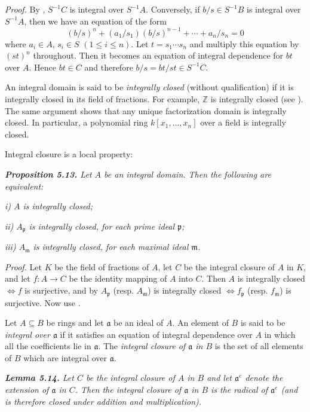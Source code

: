 \noindent\emph{Proof.}  By , $S^{-1}C$ is integral over $S^{-1}A$.  Conversely, if $b/s\in S^{-1}B$ is
integral over $S^{-1}A$, then we have an equation of the form
\[
(b/s)^n+(a_1/s_1)(b/s)^{n-1}+\cdots+a_n/s_n=0
\]
where $a_i\in A$, $s_i\in S$ $(1\leq i\leq n)$.  Let $t=s_1\cdots s_n$ and multiply this equation by
$(st)^n$ throughout.  Then it becomes an equation of integral dependence for $bt$
over $A$.  Hence $bt\in C$ and therefore $b/s=bt/st\in S^{-1}C$.\proofbox

An integral domain is said to be \emph{integrally closed} (without qualification)
if it is integrally closed in its field of fractions.  For example, $\mathbb Z$ is integrally
closed (see ).  The same argument shows that any unique factorization
domain is integrally closed.  In particular, a polynomial ring $k[x_1,\ldots,x_n]$ over
a field is integrally closed.

Integral closure is a local property:

\medskip
\noindent\textit{\textbf{Proposition 5.13.} Let $A$ be an integral domain.  Then the following are
equivalent:}

\noindent\textit{i) $A$ is integrally closed;}

\noindent\textit{ii) $A_\mathfrak p$ is integrally closed, for each prime ideal $\mathfrak p$;}

\noindent\textit{iii) $A_\mathfrak m$ is integrally closed, for each maximal ideal $\mathfrak m$.}

\noindent\emph{Proof.}  Let $K$ be the field of fractions of $A$, let $C$ be the integral closure of $A$ in $K$,
and let $f:A\longrightarrow C$ be the identity mapping of $A$ into $C$.  Then $A$ is integrally
closed $\Longleftrightarrow f$ is surjective, and by  $A_\mathfrak p$ (resp. $A_\mathfrak m$) is integrally closed $\Longleftrightarrow f_\mathfrak p$
(resp. $f_\mathfrak m$) is surjective.  Now use .\proofbox

Let $A\subseteq B$ be rings and let $\mathfrak a$ be an ideal of $A$.  An element of $B$ is said to be
\emph{integral over $\mathfrak a$} if it satisfies an equation of integral dependence over $A$ in which
all the coefficients lie in $\mathfrak a$.  The \emph{integral closure of $\mathfrak a$ in $B$} is the set of all elements
of $B$ which are integral over $\mathfrak a$.

\medskip
\noindent\textit{\textbf{Lemma 5.14.} Let $C$ be the integral closure of $A$ in $B$ and let $\mathfrak a^e$ denote the
extension of $\mathfrak a$ in $C$.  Then the integral closure of $\mathfrak a$ in $B$ is the radical of $\mathfrak a^e$
(and is therefore closed under addition and multiplication).}


